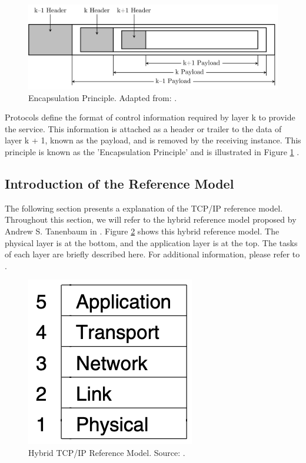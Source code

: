 \begin{figure}[h!]
    \centering
    \includegraphics[width=1\linewidth]{figures/tcpip_refmodel/image2.pdf}
    \caption[Encapsulation Principle]{Encapsulation Principle. Adapted from: \cite{Tanenbaum2010}.}
    \label{fig:EncapsulationPrinciple}
\end{figure}

Protocols define the format of control information required by layer k to provide the service. This information is attached as a header or trailer to the data of layer k + 1, known as the payload, and is removed by the receiving instance. This principle is known as the 'Encapsulation Principle' and is illustrated in Figure \ref{fig:EncapsulationPrinciple} \cite{Tanenbaum2010}.



\subsection{Introduction of the Reference Model}

The following section presents a explanation of the TCP/IP reference model. Throughout this section, we will refer to the hybrid reference model proposed by Andrew S. Tanenbaum in \cite{Tanenbaum2010}. Figure \ref{fig:RefModel} shows this hybrid reference model. The physical layer is at the bottom, and the application layer is at the top. The tasks of each layer are briefly described here. For additional information, please refer to \cite{Tanenbaum2010}.

\begin{figure}[h]
    \centering
    \includegraphics[width=0.25\linewidth]{figures/tcpip_refmodel/image3.png}
    \caption[Hybrid TCP/IP Reference Model]{Hybrid TCP/IP Reference Model. Source: \cite{Tanenbaum2010}.}
    \label{fig:RefModel}
\end{figure}
	
